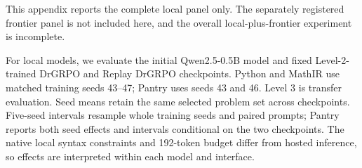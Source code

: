 This appendix reports the complete local panel only. The separately registered frontier panel is not included here, and the overall local-plus-frontier experiment is incomplete.

For local models, we evaluate the initial Qwen2.5-0.5B model and fixed Level-2-trained DrGRPO and Replay DrGRPO checkpoints. Python and MathIR use matched training seeds 43--47; Pantry uses seeds 43 and 46. Level 3 is transfer evaluation. Seed means retain the same selected problem set across checkpoints. Five-seed intervals resample whole training seeds and paired prompts; Pantry reports both seed effects and intervals conditional on the two checkpoints. The native local syntax constraints and 192-token budget differ from hosted inference, so effects are interpreted within each model and interface.


